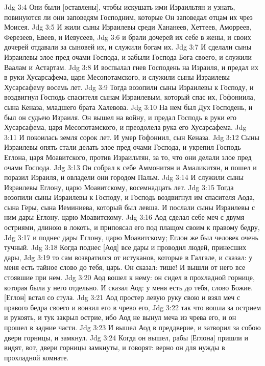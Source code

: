 Jdg 3:4  Они были [оставлены], чтобы искушать ими Израильтян и узнать, повинуются ли они заповедям Господним, которые Он заповедал отцам их чрез Моисея.
Jdg 3:5  И жили сыны Израилевы среди Хананеев, Хеттеев, Аморреев, Ферезеев, Евеев, и Иевусеев,
Jdg 3:6  и брали дочерей их себе в жены, и своих дочерей отдавали за сыновей их, и служили богам их.
Jdg 3:7  И сделали сыны Израилевы злое пред очами Господа, и забыли Господа Бога своего, и служили Ваалам и Астартам.
Jdg 3:8  И воспылал гнев Господень на Израиля, и предал их в руки Хусарсафема, царя Месопотамского, и служили сыны Израилевы Хусарсафему восемь лет.
Jdg 3:9  Тогда возопили сыны Израилевы к Господу, и воздвигнул Господь спасителя сынам Израилевым, который спас их, Гофониила, сына Кеназа, младшего брата Халевова.
Jdg 3:10  На нем был Дух Господень, и был он судьею Израиля. Он вышел на войну, и предал Господь в руки его Хусарсафема, царя Месопотамского, и преодолела рука его Хусарсафема.
Jdg 3:11  И покоилась земля сорок лет. И умер Гофониил, сын Кеназа.
Jdg 3:12  Сыны Израилевы опять стали делать злое пред очами Господа, и укрепил Господь Еглона, царя Моавитского, против Израильтян, за то, что они делали злое пред очами Господа.
Jdg 3:13  Он собрал к себе Аммонитян и Амаликитян, и пошел и поразил Израиля, и овладели они городом Пальм.
Jdg 3:14  И служили сыны Израилевы Еглону, царю Моавитскому, восемнадцать лет.
Jdg 3:15  Тогда возопили сыны Израилевы к Господу, и Господь воздвигнул им спасителя Аода, сына Геры, сына Иеминиева, который был левша. И послали сыны Израилевы с ним дары Еглону, царю Моавитскому.
Jdg 3:16  Аод сделал себе меч с двумя остриями, длиною в локоть, и припоясал его под плащом своим к правому бедру,
Jdg 3:17  и поднес дары Еглону, царю Моавитскому; Еглон же был человек очень тучный.
Jdg 3:18  Когда поднес [Аод] все дары и проводил людей, принесших дары,
Jdg 3:19  то сам возвратился от истуканов, которые в Галгале, и сказал: у меня есть тайное слово до тебя, царь. Он сказал: тише! И вышли от него все стоявшие при нем.
Jdg 3:20  Аод вошел к нему: он сидел в прохладной горнице, которая была у него отдельно. И сказал Аод: у меня есть до тебя, слово Божие. [Еглон] встал со стула.
Jdg 3:21  Аод простер левую руку свою и взял меч с правого бедра своего и вонзил его в чрево его,
Jdg 3:22  так что вошла за острием и рукоять, и тук закрыл острие, ибо Аод не вынул меча из чрева его, и он прошел в задние части.
Jdg 3:23  И вышел Аод в преддверие, и затворил за собою двери горницы, и замкнул.
Jdg 3:24  Когда он вышел, рабы [Еглона] пришли и видят, вот, двери горницы замкнуты, и говорят: верно он для нужды в прохладной комнате.
